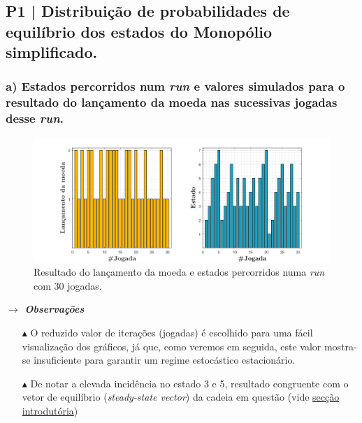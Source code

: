\clearpage
\subsection{P1 | Distribuição de probabilidades de equilíbrio dos estados do Monopólio simplificado.}
\label{subsec:P1}

\subsubsection{a) Estados percorridos num \textit{run} e valores simulados para o resultado do lançamento da moeda nas sucessivas jogadas desse \textit{run}.}
\label{subsubsec:P1a}

\vspace{-1em}
\begin{figure}[H]
    \centering
    \includegraphics[width = 1\linewidth]{img/P1/P1a.png}
    \caption{Resultado do lançamento da moeda e estados percorridos numa \textit{run} com 30 jogadas\protect\footnotemark[2].}
    \label{fig:P1a}
\end{figure}
\noindent\textbf{\textit{$\rightarrow$ Observações}}

\begin{itemize}
    \item[$\blacktriangle$] O reduzido valor de iterações (jogadas) é escolhido para uma fácil visualização dos gráficos, já que, como veremos em seguida, este valor mostra-se insuficiente para garantir um regime estocástico estacionário.
    \item[$\blacktriangle$] De notar a elevada incidência no estado 3  e 5, resultado congruente com o vetor de equilíbrio (\textit{steady-state vector}) da cadeia em questão (vide \hyperref[subsec:intro]{secção introdutória})
\end{itemize}

